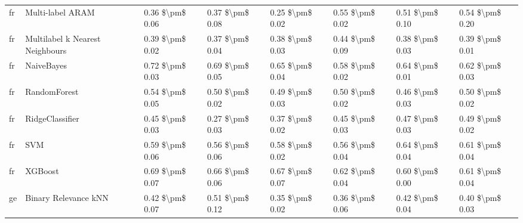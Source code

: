 \begin{tabular}{llllllll}
      fr &                Multi-label ARAM &     0.36 \$\textbackslash pm\$ 0.06 &           0.37 \$\textbackslash pm\$ 0.08 &       0.25 \$\textbackslash pm\$ 0.02 &        0.55 \$\textbackslash pm\$ 0.02 &                         0.51 \$\textbackslash pm\$ 0.10 &     0.54 \$\textbackslash pm\$ 0.20 \\
      fr & Multilabel k Nearest Neighbours &     0.39 \$\textbackslash pm\$ 0.02 &           0.37 \$\textbackslash pm\$ 0.04 &       0.38 \$\textbackslash pm\$ 0.03 &        0.44 \$\textbackslash pm\$ 0.09 &                         0.38 \$\textbackslash pm\$ 0.03 &     0.39 \$\textbackslash pm\$ 0.01 \\
      fr &                      NaiveBayes &     0.72 \$\textbackslash pm\$ 0.03 &           0.69 \$\textbackslash pm\$ 0.05 &       0.65 \$\textbackslash pm\$ 0.04 &        0.58 \$\textbackslash pm\$ 0.02 &                         0.64 \$\textbackslash pm\$ 0.01 &     0.62 \$\textbackslash pm\$ 0.03 \\
      fr &                    RandomForest &     0.54 \$\textbackslash pm\$ 0.05 &           0.50 \$\textbackslash pm\$ 0.02 &       0.49 \$\textbackslash pm\$ 0.03 &        0.50 \$\textbackslash pm\$ 0.02 &                         0.46 \$\textbackslash pm\$ 0.03 &     0.50 \$\textbackslash pm\$ 0.02 \\
      fr &                 RidgeClassifier &     0.45 \$\textbackslash pm\$ 0.03 &           0.27 \$\textbackslash pm\$ 0.03 &       0.37 \$\textbackslash pm\$ 0.02 &        0.45 \$\textbackslash pm\$ 0.03 &                         0.47 \$\textbackslash pm\$ 0.03 &     0.49 \$\textbackslash pm\$ 0.02 \\
      fr &                             SVM &     0.59 \$\textbackslash pm\$ 0.06 &           0.56 \$\textbackslash pm\$ 0.06 &       0.58 \$\textbackslash pm\$ 0.02 &        0.56 \$\textbackslash pm\$ 0.04 &                         0.64 \$\textbackslash pm\$ 0.04 &     0.61 \$\textbackslash pm\$ 0.04 \\
      fr &                         XGBoost &     0.69 \$\textbackslash pm\$ 0.07 &           0.66 \$\textbackslash pm\$ 0.06 &       0.67 \$\textbackslash pm\$ 0.07 &        0.62 \$\textbackslash pm\$ 0.04 &                         0.60 \$\textbackslash pm\$ 0.00 &     0.61 \$\textbackslash pm\$ 0.04 \\
      ge &            Binary Relevance kNN &     0.42 \$\textbackslash pm\$ 0.07 &           0.51 \$\textbackslash pm\$ 0.12 &       0.35 \$\textbackslash pm\$ 0.02 &        0.36 \$\textbackslash pm\$ 0.06 &                         0.42 \$\textbackslash pm\$ 0.04 &     0.40 \$\textbackslash pm\$ 0.03 \\

\end{tabular}
